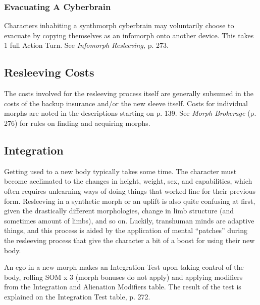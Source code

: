 \subsubsection{Evacuating A Cyberbrain} 

Characters inhabiting a synthmorph cyberbrain may voluntarily choose to evacuate by copying themselves as an infomorph onto another device. This takes 1 full Action Turn. See \textit{Infomorph Resleeving,} p. 273. 

\subsection{Resleeving Costs} 

The costs involved for the resleeving process itself are generally subsumed in the costs of the backup insurance and/or the new sleeve itself. Costs for individual morphs are noted in the descriptions starting on p. 139. See \textit{Morph Brokerage} (p. 276) for rules on finding and acquiring morphs. 

\subsection{Integration} 

Getting used to a new body typically takes some time. The character must become acclimated to the changes in height, weight, sex, and capabilities, which often requires unlearning ways of doing things that worked fine for their previous form. Resleeving in a synthetic morph or an uplift is also quite confusing at first, given the drastically different morphologies, change in limb structure (and sometimes amount of limbs), and so on. Luckily, transhuman minds are adaptive things, and this process is aided by the application of mental ``patches'' during the resleeving process that give the character a bit of a boost for using their new body. 

An ego in a new morph makes an Integration Test upon taking control of the body, rolling SOM x 3 (morph bonuses do not apply) and applying modifiers from the Integration and Alienation Modifiers table. The result of the test is explained on the Integration Test table, p. 272. 

\\ 



